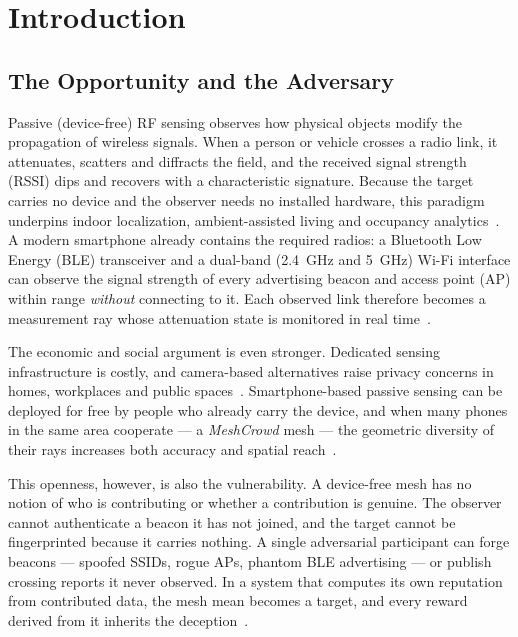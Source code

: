 \documentclass[journal,10pt]{IEEEtran}
\begin{document}
\section{Introduction}

\subsection{The Opportunity and the Adversary}
Passive (device-free) RF sensing observes how physical objects modify the
propagation of wireless signals. When a person or vehicle crosses a radio
link, it attenuates, scatters and diffracts the field, and the received signal
strength (RSSI) dips and recovers with a characteristic signature. Because the
target carries no device and the observer needs no installed hardware, this
paradigm underpins indoor localization, ambient-assisted living and occupancy
analytics~\cite{wilson2010,januszkiewicz2018}. A modern smartphone already
contains the required radios: a Bluetooth Low Energy (BLE) transceiver and a
dual-band (2.4~GHz and 5~GHz) Wi-Fi interface can observe the signal strength
of every advertising beacon and access point (AP) within range \emph{without}
connecting to it. Each observed link therefore becomes a measurement ray whose
attenuation state is monitored in real time~\cite{ramirez2021,milano2024}.

The economic and social argument is even stronger. Dedicated sensing
infrastructure is costly, and camera-based alternatives raise privacy concerns
in homes, workplaces and public spaces~\cite{khan2023,zhou2020,dmip2023}.
Smartphone-based passive sensing can be deployed for free by people who already
carry the device, and when many phones in the same area cooperate --- a
\emph{MeshCrowd} mesh --- the geometric diversity of their rays increases
both accuracy and spatial reach~\cite{li2024}.

This openness, however, is also the vulnerability. A device-free mesh has no
notion of who is contributing or whether a contribution is genuine. The observer
cannot authenticate a beacon it has not joined, and the target cannot be
fingerprinted because it carries nothing. A single adversarial participant can
forge beacons --- spoofed SSIDs, rogue APs, phantom BLE advertising --- or
publish crossing reports it never observed. In a system that computes its own
reputation from contributed data, the mesh mean becomes a target, and every
reward derived from it inherits the deception~\cite{zhang2022,wang2018}.
\end{document}
